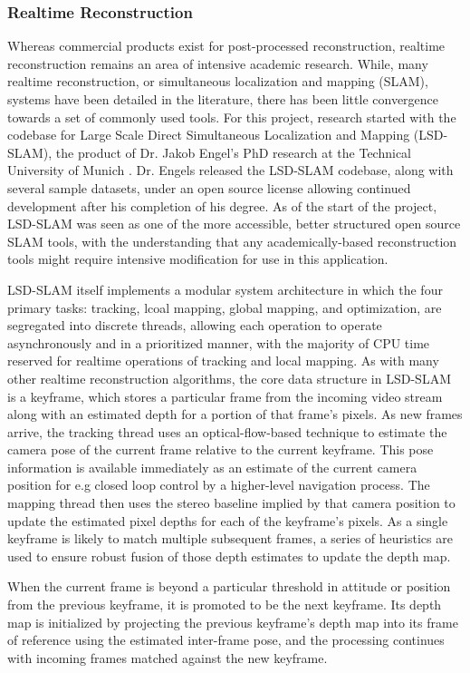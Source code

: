\documentclass[letterpaper,12pt]{article}
\begin{document}
\subsubsection{Realtime Reconstruction}

Whereas commercial products exist for post-processed reconstruction, realtime reconstruction remains an area of intensive academic research.   While, many realtime reconstruction, or simultaneous localization and mapping (SLAM), systems have been detailed in the literature, there has been little convergence towards a set of commonly used tools.   For this project, research started with the codebase for Large Scale Direct Simultaneous Localization and Mapping (LSD-SLAM), the product of Dr. Jakob Engel's PhD research at the Technical University of Munich \cite{engel2014lsd}.   Dr. Engels released the LSD-SLAM codebase, along with several sample datasets, under an open source license allowing continued development after his completion of his degree.   As of the start of the project, LSD-SLAM was seen as one of the more accessible, better structured open source SLAM tools, with the understanding that any academically-based reconstruction tools might require intensive modification for use in this application.

LSD-SLAM itself implements a modular system architecture in which the four primary tasks: tracking, lcoal mapping, global mapping, and optimization, are segregated into discrete threads, allowing each operation to operate asynchronously and in a prioritized manner, with the majority of CPU time reserved for realtime operations of tracking and local mapping.   As with many other realtime reconstruction algorithms, the core data structure in LSD-SLAM is a keyframe, which stores a particular frame from the incoming video stream along with an estimated depth for a portion of that frame's pixels.   As new frames arrive, the tracking thread uses an optical-flow-based technique to estimate the camera pose of the current frame relative to the current keyframe.  This pose information is available immediately as an estimate of the current camera position for e.g closed loop control by a higher-level navigation process.  The mapping thread then uses the stereo baseline implied by that camera position to update the estimated pixel depths for each of the keyframe's pixels.   As a single keyframe is likely to match multiple subsequent frames, a series of heuristics are used to ensure robust fusion of those depth estimates to update the depth map.

When the current frame is beyond a particular threshold in attitude or position from the previous keyframe, it is promoted to be the next keyframe.  Its depth map is initialized by projecting the previous keyframe's depth map into its frame of reference using the estimated inter-frame pose, and the processing continues with incoming frames matched against the new keyframe.
\end{document}
